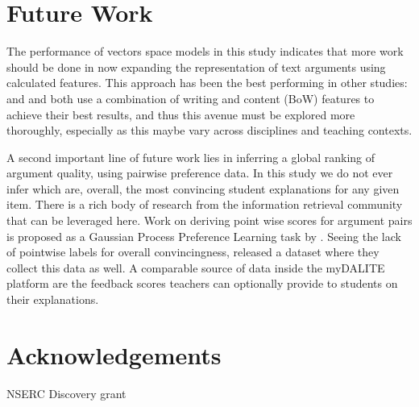 \documentclass[runningheads]{llncs}
\begin{document}
\section{Future Work}

The performance of vectors space models in this study indicates that more work 
should be done in now expanding the representation of text arguments using 
calculated features.
This approach has been the best performing in other studies: 
\cite{louis_what_2013} and \cite{nguyen_computational_2015} and both use a 
combination of writing and content (BoW) features to achieve their best 
results, and thus this avenue must be explored more thoroughly, especially as 
this maybe vary across disciplines and teaching contexts. 

A second important line of future work lies in inferring a global ranking of 
argument quality, using pairwise preference data.
In this study we do not ever infer which are, overall, the most convincing 
student explanations for any given item. 
There is a rich body of research from the information retrieval 
community~\cite{chen_pairwise_2013} that can be leveraged here. 
Work on deriving point wise scores for argument pairs is proposed as a Gaussian 
Process Preference Learning task by \cite{simpson_finding_2018}. 
Seeing the lack of pointwise labels for overall convincingness, 
\cite{toledo_automatic_2019} released a dataset where they 
collect this data as well. 
A comparable source of data inside the myDALITE platform are the feedback 
scores teachers can optionally provide to students on their explanations.

\section{Acknowledgements}
NSERC Discovery grant

 
 
\end{document}
